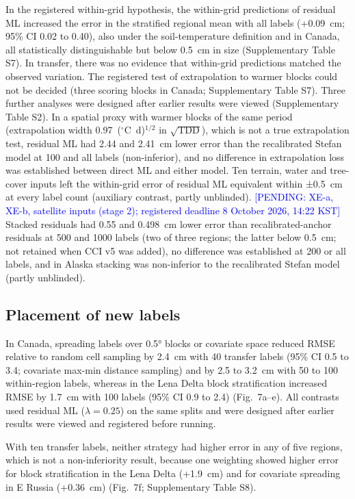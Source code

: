 In the registered within-grid hypothesis, the within-grid predictions of residual ML increased the error in the stratified regional mean with all labels (+0.09~cm; 95\% CI 0.02 to 0.40), also under the soil-temperature definition and in Canada, all statistically distinguishable but below 0.5~cm in size (Supplementary Table S7).
In transfer, there was no evidence that within-grid predictions matched the observed variation.
The registered test of extrapolation to warmer blocks could not be decided (three scoring blocks in Canada; Supplementary Table S7).
Three further analyses were designed after earlier results were viewed (Supplementary Table S2).
In a spatial proxy with warmer blocks of the same period (extrapolation width 0.97~($^{\circ}$C~d)$^{1/2}$ in $\sqrt{\mathrm{TDD}}$), which is not a true extrapolation test, residual ML had 2.44 and 2.41~cm lower error than the recalibrated Stefan model at 100 and all labels (non-inferior), and no difference in extrapolation loss was established between direct ML and either model.
Ten terrain, water and tree-cover inputs left the within-grid error of residual ML equivalent within ±0.5~cm at every label count (auxiliary contrast, partly unblinded). \textcolor{blue}{[PENDING: XE-a, XE-b, satellite inputs (stage 2); registered deadline 8 October 2026, 14:22 KST]}
Stacked residuals had 0.55 and 0.498~cm lower error than recalibrated-anchor residuals at 500 and 1000 labels (two of three regions; the latter below 0.5~cm; not retained when CCI v5 was added), no difference was established at 200 or all labels, and in Alaska stacking was non-inferior to the recalibrated Stefan model (partly unblinded).

\subsection{Placement of new labels}
\label{sec:results-placement}

In Canada, spreading labels over 0.5° blocks or covariate space reduced RMSE relative to random cell sampling by 2.4~cm with 40 transfer labels (95\% CI 0.5 to 3.4; covariate max-min distance sampling) and by 2.5 to 3.2~cm with 50 to 100 within-region labels, whereas in the Lena Delta block stratification increased RMSE by 1.7~cm with 100 labels (95\% CI 0.9 to 2.4) (Fig.~7a--e).
All contrasts used residual ML ($\lambda = 0.25$) on the same splits and were designed after earlier results were viewed and registered before running.

With ten transfer labels, neither strategy had higher error in any of five regions, which is not a non-inferiority result, because one weighting showed higher error for block stratification in the Lena Delta (+1.9~cm) and for covariate spreading in E Russia (+0.36~cm) (Fig.~7f; Supplementary Table S8).

